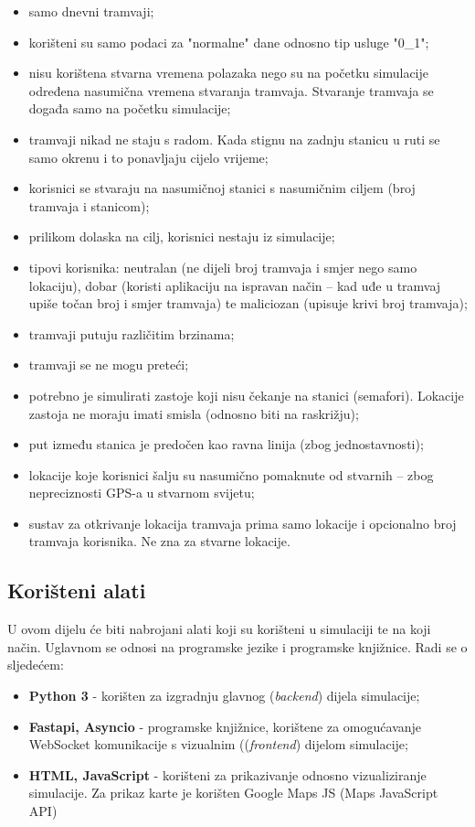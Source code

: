 \documentclass[times, utf8, diplomski]{fer}
\begin{document}
\begin{itemize}
    \item samo dnevni tramvaji;
    \item korišteni su samo podaci za "normalne" dane odnosno tip usluge "0\_1";
    \item nisu korištena stvarna vremena polazaka nego su na početku simulacije određena nasumična vremena stvaranja tramvaja. Stvaranje tramvaja se događa samo na početku simulacije;
    \item tramvaji nikad ne staju s radom. Kada stignu na zadnju stanicu u ruti se samo okrenu i to ponavljaju cijelo vrijeme;
    \item korisnici se stvaraju na nasumičnoj stanici s nasumičnim ciljem (broj tramvaja i stanicom); 
    \item prilikom dolaska na cilj, korisnici nestaju iz simulacije;
    \item tipovi korisnika: neutralan (ne dijeli broj tramvaja i smjer nego samo lokaciju), dobar (koristi aplikaciju na ispravan način -- kad uđe u tramvaj upiše točan broj i smjer tramvaja) te maliciozan (upisuje krivi broj tramvaja);
    \item tramvaji putuju različitim brzinama;
    \item tramvaji se ne mogu preteći;
    \item potrebno je simulirati zastoje koji nisu čekanje na stanici (semafori). Lokacije zastoja ne moraju imati smisla (odnosno biti na raskrižju);
    \item put između stanica je predočen kao ravna linija (zbog jednostavnosti);
    \item lokacije koje korisnici šalju su nasumično pomaknute od stvarnih -- zbog nepreciznosti GPS-a u stvarnom svijetu;
    \item sustav za otkrivanje lokacija tramvaja prima samo lokacije i opcionalno broj tramvaja korisnika. Ne zna za stvarne lokacije.
\end{itemize}

\subsection{Korišteni alati}
U ovom dijelu će biti nabrojani alati koji su korišteni u simulaciji te na koji način. Uglavnom se odnosi na programske jezike i programske knjižnice. Radi se o sljedećem:
\begin{itemize}
    \item \textbf{Python 3} - korišten za izgradnju glavnog (\emph{backend}) dijela simulacije;
    \item \textbf{Fastapi, Asyncio} - programske knjižnice, korištene za omogućavanje WebSocket komunikacije s vizualnim ((\emph{frontend}) dijelom simulacije;
    \item \textbf{HTML, JavaScript} - korišteni za prikazivanje odnosno vizualiziranje simulacije. Za prikaz karte je korišten Google Maps JS (Maps JavaScript API)
\end{itemize}
\end{document}
